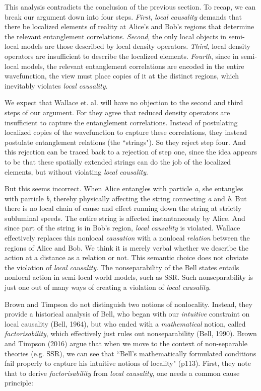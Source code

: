 \documentclass[12pt]{article}
\begin{document}
This analysis contradicts the conclusion of the previous section. To recap, we can break our argument down into four steps. \textit{First}, \textit{local causality} demands that there be localized elements of reality at Alice's and Bob's regions that determine the relevant entanglement correlations. \textit{Second}, the only local objects in semi-local models are those described by local density operators. \textit{Third}, local density operators are insufficient to describe the localized elements. \textit{Fourth}, since in semi-local models, the relevant entanglement correlations are encoded in the entire wavefunction, the view must place copies of it at the distinct regions, which inevitably violates \textit{local causality}. 

We expect that Wallace et. al. will have no objection to the second and third steps of our argument. For they agree that reduced density operators are insufficient to capture the entanglement correlations. Instead of postulating localized copies of the wavefunction to capture these correlations, they instead postulate entanglement relations (the ``strings"). So they reject step four. And this rejection can be traced back to a rejection of step one, since the idea appears to be that these spatially extended strings can do the job of the localized elements, but without violating \textit{local causality}. 

But this seems incorrect. When Alice entangles with particle \textit{a}, she entangles with particle \textit{b}, thereby physically affecting the string connecting \textit{a} and \textit{b}. But there is no local chain of cause and effect running down the string at strictly subluminal speeds. The entire string is affected instantaneously by Alice. And since part of the string is in Bob's region, \textit{local causality} is violated. Wallace effectively replaces this nonlocal \textit{causation} with a nonlocal \textit{relation} between the regions of Alice and Bob. We think it is merely verbal whether we describe the action at a distance as a relation or not. This semantic choice does not obviate the violation of \textit{local causality}. The nonseparability of the Bell states entails nonlocal action in semi-local world models, such as SSR. Such nonseparability is just one out of many ways of creating a violation of \textit{local causality}. 

Brown and Timpson do not distinguish two notions of nonlocality. Instead, they provide a historical analysis of Bell, who began with our \textit{intuitive} constraint on local causality (Bell, 1964), but who ended with a \textit{mathematical} notion, called \textit{factorisability}, which effectively just rules out nonseparability (Bell, 1990). Brown and Timpson (2016) argue that when we move to the context of non-separable theories (e.g. SSR), we can see that ``Bell's mathematically formulated conditions fail properly to capture his intuitive notions of locality" (p113). First, they note that to derive \textit{factorisability} from \textit{local causality}, one needs a common cause principle:
\end{document}
